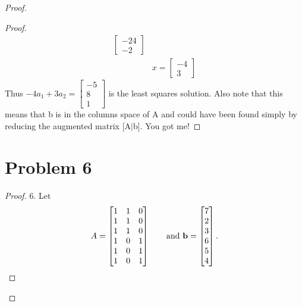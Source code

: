 \documentclass[12pt]{article}
\newcommand{\sect}[1]{\section*{#1}}
\begin{document}
\begin{proof}
\begin{proof}
\begin{align*}
\begin{bmatrix}
    -24\\-2
    \end{bmatrix}\\
    &x=\begin{bmatrix}
      -4\\3
  \end{bmatrix}
  \end{align*}
  Thus $-4a_1+3a_2 =\begin{bmatrix}
    -5\\8\\1
  \end{bmatrix}$ is the least squares solution. Also note that this means that b is in the columns space of A and could have been found simply by reducing the augmented matrix [A$|$b]. You got me!
\end{proof}
\sect{Problem 6}
\begin{proof}
    6. Let
    \[
    A = \begin{bmatrix}1 & 1 & 0\\1 & 1 & 0\\1 & 1 & 0\\ 1 & 0 & 1\\ 1 & 0 & 1 \\1 & 0 & 1 \end{bmatrix} \hskip 20pt \text{and } {\bf b} = \begin{bmatrix} 7\\ 2\\3\\6\\5\\4\end{bmatrix}.
    \]


\end{proof}
\end{proof}
\end{document}
